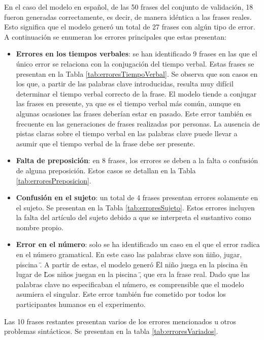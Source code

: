 \documentclass[11pt,spanish,listoffigures,listoftables]{tfgetsinf}
\begin{document}
En el caso del modelo en español, de las 50 frases del conjunto de validación, 18 fueron generadas correctamente, es decir, de manera idéntica a las frases reales. Esto significa que el modelo generó un total de 27 frases con algún tipo de error. A continuación se enumeran los errores principales que estas presentan:

\begin{itemize}
	\item \textbf{Errores en los tiempos verbales}: se han identificado 9 frases en las que el único error se relaciona con la conjugación del tiempo verbal. Estas frases se presentan en la Tabla \ref{tab:erroresTiempoVerbal}. Se observa que son casos en los que, a partir de las palabras clave introducidas, resulta muy difícil determinar el tiempo verbal correcto de la frase. El modelo tiende a conjugar las frases en presente, ya que es el tiempo verbal más común, aunque en algunas ocasiones las frases deberían estar en pasado. Este error también es frecuente en las generaciones de frases realizadas por personas. La ausencia de pistas claras sobre el tiempo verbal en las palabras clave puede llevar a asumir que el tiempo verbal de la frase debe ser presente.
	\item \textbf{Falta de preposición}: en 8 frases, los errores se deben a la falta o confusión de alguna preposición. Estos casos se detallan en la Tabla \ref{tab:erroresPreposicion}.
	\item \textbf{Confusión en el sujeto}: un total de 4 frases presentan errores solamente en el sujeto. Se presentan en la Tabla \ref{tab:erroresSujeto}. Estos errores incluyen la falta del artículo del sujeto debido a que se interpreta el sustantivo como nombre propio.
	\item \textbf{Error en el número}: solo se ha identificado un caso en el que el error radica en el número gramatical. En este caso las palabras clave son \" niño, jugar, piscina \". A partir de estas, el modelo generó \" El niño juega en la piscina \" en lugar de  \" Los niños juegan en la piscina \", que era la frase real. Dado que las palabras clave no especificaban el número, es comprensible que el modelo asumiera el singular. Este error también fue cometido por todos los participantes humanos en el experimento.
\end{itemize}

Las 10 frases restantes presentan varios de los errores mencionados u otros problemas sintácticos. Se presentan en la tabla \ref{tab:erroresVariados}.
\end{document}
